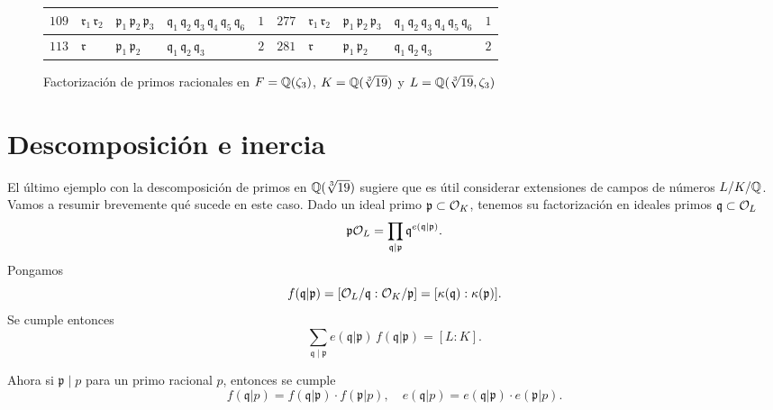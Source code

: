 \begin{figure}
\begin{center}
\begin{tabular}{x{0.75cm}x{1cm}x{1.25cm}x{2.5cm}x{0.75cm}x{0.75cm}x{1cm}x{1.25cm}x{2.5cm}x{0.75cm}}
      \hline
      $109$ & $\mathfrak{r}_1\,\mathfrak{r}_2$ & $\mathfrak{p}_1\,\mathfrak{p}_2\,\mathfrak{p}_3$ & $\mathfrak{q}_1\,\mathfrak{q}_2\,\mathfrak{q}_3\,\mathfrak{q}_4\,\mathfrak{q}_5\,\mathfrak{q}_6$ & $1$ & $277$ & $\mathfrak{r}_1\,\mathfrak{r}_2$ & $\mathfrak{p}_1\,\mathfrak{p}_2\,\mathfrak{p}_3$ & $\mathfrak{q}_1\,\mathfrak{q}_2\,\mathfrak{q}_3\,\mathfrak{q}_4\,\mathfrak{q}_5\,\mathfrak{q}_6$ & $1$ \tabularnewline
      \hline
      $113$ & $\mathfrak{r}$ & $\mathfrak{p}_1\,\mathfrak{p}_2$ & $\mathfrak{q}_1\,\mathfrak{q}_2\,\mathfrak{q}_3$ & $2$ & $281$ & $\mathfrak{r}$ & $\mathfrak{p}_1\,\mathfrak{p}_2$ & $\mathfrak{q}_1\,\mathfrak{q}_2\,\mathfrak{q}_3$ & $2$ \tabularnewline
      \hline
    \end{tabular}
  \end{center}

  \caption{Factorización de primos racionales en $F = \mathbb{Q} (\zeta_3)$, $K = \mathbb{Q} (\sqrt[3]{19})$ y $L = \mathbb{Q} (\sqrt[3]{19}, \zeta_3)$}
  \label{fig:cerradura-de-sqrt-19}
\end{figure}


\section{Descomposición e inercia}
\label{sec:descomposicion-e-inercia}

El último ejemplo con la descomposición de primos en $\mathbb{Q} (\sqrt[3]{19})$
sugiere que es útil considerar extensiones de campos de números $L/K/\mathbb{Q}$.
Vamos a resumir brevemente qué sucede en este caso. Dado un ideal primo
$\mathfrak{p} \subset \mathcal{O}_K$, tenemos su factorización en ideales primos
$\mathfrak{q} \subset \mathcal{O}_L$
$$\mathfrak{p}\mathcal{O}_L = \prod_{\mathfrak{q} \mid \mathfrak{p}} \mathfrak{q}^{e (\mathfrak{q}|\mathfrak{p})}.$$
Pongamos
\[ f (\mathfrak{q}|\mathfrak{p})
   = [\mathcal{O}_L/\mathfrak{q} : \mathcal{O}_K/\mathfrak{p}]
   = [\kappa (\mathfrak{q}) : \kappa (\mathfrak{p})]. \]
Se cumple entonces
$$\sum_{\mathfrak{q} \mid \mathfrak{p}} e (\mathfrak{q}|\mathfrak{p}) \, f (\mathfrak{q}|\mathfrak{p}) = [L : K].$$

Ahora si $\mathfrak{p} \mid p$ para un primo racional $p$, entonces se cumple
\[ f (\mathfrak{q}|p) = f (\mathfrak{q}|\mathfrak{p}) \cdot f (\mathfrak{p}|p),
   \quad
   e (\mathfrak{q}|p) = e (\mathfrak{q}|\mathfrak{p}) \cdot e (\mathfrak{p}|p). \]

